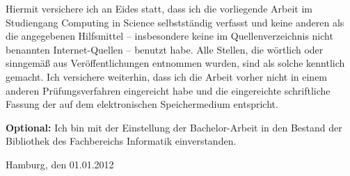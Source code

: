 \documentclass[
	12pt,
	a4paper,
	BCOR10mm,
	DIV14,
	listof=totoc,
	bibliography=totoc,
	headsepline
]{scrreprt}
\begin{document}
Hiermit  versichere  ich  an  Eides  statt,  dass  ich  die   vorliegende  Arbeit  im 
Studiengang  Computing  in  Science  selbstständig  verfasst  und  keine  anderen  als 
die  angegebenen  Hilfsmittel – insbesondere  keine  im  Quellenverzeichnis  nicht 
benannten  Internet-Quellen – benutzt  habe.  Alle  Stellen,  die  wörtlich  oder 
sinngemäß aus Veröffentlichungen entnommen wurden, sind als solche kenntlich 
gemacht.  Ich  versichere  weiterhin,  dass  ich  die  Arbeit  vorher  nicht  in  einem 
anderen  Prüfungsverfahren  eingereicht  habe  und  die  eingereichte  schriftliche 
Fassung der auf dem elektronischen 
Speichermedium entspricht.

\smallskip

\textbf{Optional:} Ich bin mit der Einstellung der Bachelor-Arbeit in den Bestand der Bibliothek des Fachbereichs Informatik einverstanden.

\bigskip
\bigskip
\bigskip

Hamburg, den 01.01.2012  \quad \dotfill
\end{document}
